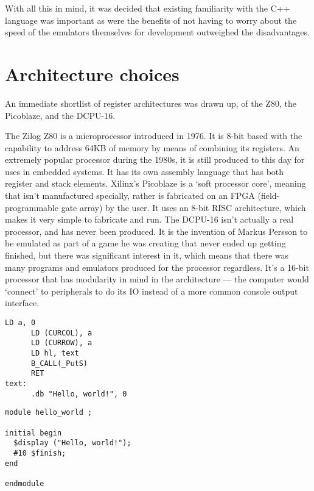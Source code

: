 With all this in mind, it was decided that existing familiarity with the C++
language was important as were the benefits of not having to worry about the
speed of the emulators themselves for development outweighed the disadvantages.

\section{Architecture choices}
An immediate shortlist of register architectures was drawn up, of the Z80, the
Picoblaze, and the DCPU-16.

The Zilog Z80 is a microprocessor introduced in 1976. It is 8-bit based with the
capability to address 64KB of memory by means of combining its registers. An
extremely popular processor during the 1980s, it is still produced to this day
for uses in embedded systems. It has its own assembly language that has both
register and stack elements. Xilinx's Picoblaze is a `soft processor core',
meaning that isn't manufactured specially, rather is fabricated on an FPGA
(field-programmable gate array) by the user. It uses an 8-bit RISC architecture,
which makes it very simple to fabricate and run. The DCPU-16 isn't actually a
real processor, and has never been produced. It is the invention of Markus
Persson to be emulated as part of a game he was creating that never ended up
getting finished, but there was significant interest in it, which means that
there was many programs and emulators produced for the processor regardless.
It's a 16-bit processor that has modularity in mind in the architecture --- the
computer would `connect' to peripherals to do its IO instead of a more common
console output interface.

\noindent\begin{minipage}{0.5\textwidth}
\begin{lstlisting}[caption={Z80 ASM},captionpos=b]
      LD a, 0
      LD (CURCOL), a
      LD (CURROW), a
      LD hl, text
      B_CALL(_PutS)
      RET
text:
      .db "Hello, world!", 0
\end{lstlisting}%
\end{minipage}%
\noindent\begin{minipage}{0.5\textwidth}
\begin{lstlisting}[caption={Picoblaze ASM},captionpos=b]
module hello_world ;

initial begin
  $display ("Hello, world!");
  #10 $finish;
end

endmodule
\end{lstlisting}%
\end{minipage}

